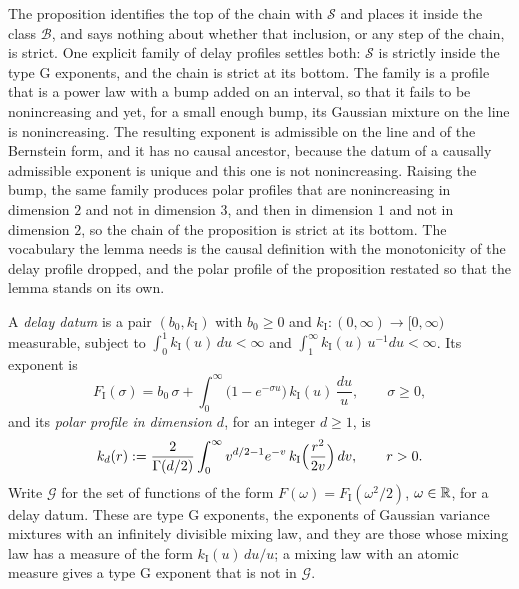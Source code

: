 The proposition identifies the top of the chain with $\mathcal{S}$ and places it inside
the class $\mathcal{B}$, and says nothing about whether that inclusion, or any step of the
chain, is strict. One explicit family of delay profiles settles both: $\mathcal{S}$ is strictly
inside the type G exponents, and the chain is strict at its bottom. The family is a profile that is a power law with a
bump added on an interval, so that it fails to be nonincreasing and yet, for a small enough
bump, its Gaussian mixture on the line is nonincreasing. The resulting exponent is admissible
on the line and of the Bernstein form, and it has no causal ancestor, because the datum of a
causally admissible exponent is unique and this one is not nonincreasing. Raising the bump, the
same family produces polar profiles that are nonincreasing in dimension $2$ and not in
dimension $3$, and then in dimension $1$ and not in dimension $2$, so the chain of the
proposition is strict at its bottom. The vocabulary the lemma needs is the causal definition
with the monotonicity of the delay profile dropped, and the polar profile of the proposition
restated so that the lemma stands on its own.

\begin{definition}
\label{def:delay-data}
A \emph{delay datum} is a pair $(b_0, k_{\mathrm I})$ with $b_0 \ge 0$ and
$k_{\mathrm I} : (0,\infty) \to [0,\infty)$ measurable, subject to
$\int_0^1 k_{\mathrm I}(u)\,du < \infty$ and $\int_1^\infty k_{\mathrm I}(u)\,u^{-1}du < \infty$.
Its exponent is
\[
  F_{\mathrm I}(\sigma) = b_0\,\sigma
   + \int_0^\infty \bigl(1 - e^{-\sigma u}\bigr)\,k_{\mathrm I}(u)\,\frac{du}{u},
  \qquad \sigma \ge 0 ,
\]
and its \emph{polar profile in dimension $d$}, for an integer $d \ge 1$, is
\begin{equation}\label{eq:polar-profile}
  k_d(r) := \frac{2}{\Gamma(d/2)}\int_0^\infty v^{d/2-1}e^{-v}\,
   k_{\mathrm I}\Bigl(\frac{r^2}{2v}\Bigr)\,dv, \qquad r > 0 .
\end{equation}
Write $\mathcal{G}$ for the set of functions of the form $F(\omega) = F_{\mathrm I}(\omega^2/2)$,
$\omega \in \mathbb{R}$, for a delay datum. These are type G exponents, the exponents of Gaussian
variance mixtures with an infinitely divisible mixing law, and they are those whose mixing law
has a \Levy{} measure of the form $k_{\mathrm I}(u)\,du/u$; a mixing law with an atomic \Levy{}
measure gives a type G exponent that is not in $\mathcal{G}$.
\end{definition}

